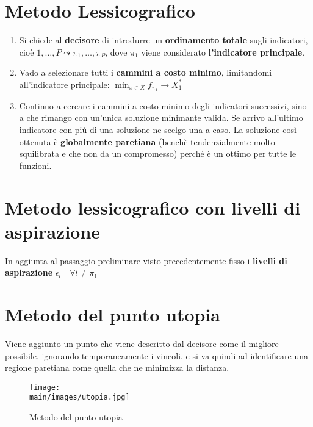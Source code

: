 \documentclass[\main/main.tex]{subfiles}
\begin{document}
\section{Metodo Lessicografico}
\begin{enumerate}
	\item Si chiede al \textbf{decisore} di introdurre un \textbf{ordinamento totale} sugli indicatori, cioè ${1, \dots, P}\leadsto{\pi_1, \dots, \pi_P}$, dove $\pi_1$ viene considerato \textbf{l'indicatore principale}.
	\item Vado a selezionare tutti i \textbf{cammini a costo minimo}, limitandomi all'indicatore principale: $\min_{x \in X} f_{\pi_1} \rightarrow X_1^*$
	\item Continuo a cercare i cammini a costo minimo degli indicatori successivi, sino a che rimango con un'unica soluzione minimante valida. Se arrivo all'ultimo indicatore con più di una soluzione ne scelgo una a caso. La soluzione così ottenuta è \textbf{globalmente paretiana} (benchè tendenzialmente molto squilibrata e che non da un compromesso) perché è un ottimo per tutte le funzioni.
\end{enumerate}

\section{Metodo lessicografico con livelli di aspirazione}
In aggiunta al passaggio preliminare visto precedentemente fisso i \textbf{livelli di aspirazione} $\epsilon_l \quad \forall l \not = \pi_1$

\section{Metodo del punto utopia}
Viene aggiunto un punto che viene descritto dal decisore come il migliore possibile, ignorando temporaneamente i vincoli, e si va quindi ad identificare una regione paretiana come quella che ne minimizza la distanza.

\begin{figure}[H]
	\centering
	\texttt{[image: \\main/images/utopia.jpg]}
	\caption{Metodo del punto utopia}
\end{figure}
\end{document}
